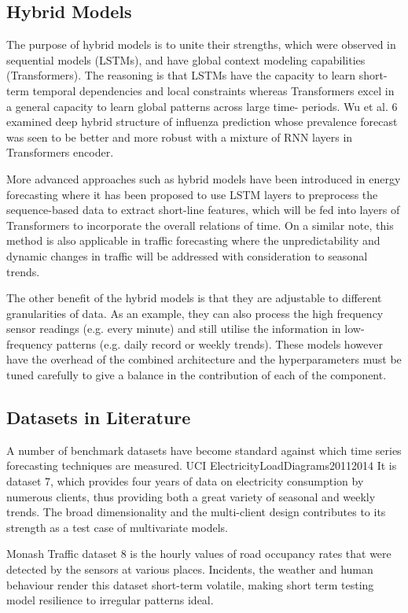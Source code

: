 \documentclass[conference]{IEEEtran}
\begin{document}
\subsection{Hybrid Models}
The purpose of hybrid models is to unite their strengths, which were observed in sequential models (LSTMs), and have global context modeling capabilities (Transformers). The reasoning is that LSTMs have the capacity to learn short-term temporal dependencies and local constraints whereas Transformers excel in a general capacity to learn global patterns across large time- periods. Wu et al. 6 examined deep hybrid structure of influenza prediction whose prevalence forecast was seen to be better and more robust with a mixture of RNN layers in Transformers encoder.

More advanced approaches such as hybrid models have been introduced in energy forecasting where it has been proposed to use LSTM \cite{hochreiter1997lstm} layers to preprocess the sequence-based data to extract short-line features, which will be fed into layers of Transformers to incorporate the overall relations of time. On a similar note, this method is also applicable in traffic forecasting where the unpredictability and dynamic changes in traffic will be addressed with consideration to seasonal trends.

The other benefit of the hybrid models is that they are adjustable to different granularities of data. As an example, they can also process the high frequency sensor readings (e.g. every minute) and still utilise the information in low-frequency patterns (e.g. daily record or weekly trends). These models however have the overhead of the combined architecture and the hyperparameters must be tuned carefully to give a balance in the contribution of each of the component.

\subsection{Datasets in Literature}
A number of benchmark datasets have become standard against which time series forecasting techniques are measured. UCI \cite{uci2011power} ElectricityLoadDiagrams20112014 \cite{uci2011power} It is dataset 7, which provides four years of data on electricity consumption by numerous clients, thus providing both a great variety of seasonal and weekly trends. The broad dimensionality and the multi-client design contributes to its strength as a test case of multivariate models.

Monash \cite{godahewa2021monash} Traffic dataset \cite{godahewa2021monash} 8 is the hourly values of road occupancy rates that were detected by the sensors at various places. Incidents, the weather and human behaviour render this dataset short-term volatile, making short term testing model resilience to irregular patterns ideal.
\end{document}
